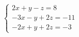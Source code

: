 \documentclass[preview]{standalone}
\begin{document}
\begin{align*}
\begin{cases} 2x + y - z = 8 \\ -3x - y + 2z = -11 \\ -2x + y + 2z = -3 \end{cases}
\end{align*}
\end{document}
